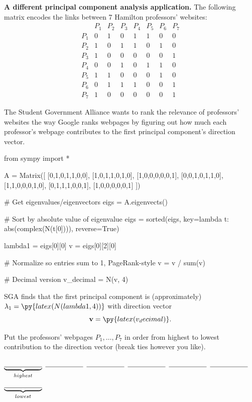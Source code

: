 \documentclass[12pt,addpoints]{exam}
\begin{document}
\begin{questions}
\question[5] \textbf{A different principal component analysis application.} The following matrix encodes the links between 7 Hamilton professors' websites:
\[
\begin{array}{c|ccccccc}
& P_1 & P_2 & P_3 & P_4 & P_5 & P_6 & P_7 \\
\hline
P_1 & 0 & 1 & 0 & 1 & 1 & 0 & 0 \\
P_2 & 1 & 0 & 1 & 1 & 0 & 1 & 0 \\
P_3 & 1 & 0 & 0 & 0 & 0 & 0 & 1 \\
P_4 & 0 & 0 & 1 & 0 & 1 & 1 & 0 \\
P_5 & 1 & 1 & 0 & 0 & 0 & 1 & 0 \\
P_6 & 0 & 1 & 1 & 1 & 0 & 0 & 1 \\
P_7 & 1 & 0 & 0 & 0 & 0 & 0 & 1
\end{array}
\]

The Student Government Alliance wants to rank the relevance of professors' websites the way Google ranks webpages by figuring out how much each professor's webpage contributes to the first principal component's direction vector.

\begin{pycode}
from sympy import *

A = Matrix([
[0,1,0,1,1,0,0],
[1,0,1,1,0,1,0],
[1,0,0,0,0,0,1],
[0,0,1,0,1,1,0],
[1,1,0,0,0,1,0],
[0,1,1,1,0,0,1],
[1,0,0,0,0,0,1]
])

# Get eigenvalues/eigenvectors
eigs = A.eigenvects()

# Sort by absolute value of eigenvalue
eigs = sorted(eigs, key=lambda t: abs(complex(N(t[0]))), reverse=True)

lambda1 = eigs[0][0]
v = eigs[0][2][0]

# Normalize so entries sum to 1, PageRank-style
v = v / sum(v)

# Decimal version
v_decimal = N(v, 4)
\end{pycode}

SGA finds that the first principal component is (approximately)
$\lambda_1 = \py{latex(N(lambda1,4))}$ with direction vector \[\mathbf v =
\py{latex(v_decimal)}.
\]

Put the professors' webpages $P_1, \ldots, P_7$ in order from highest to lowest contribution to the direction vector (break ties however you like).

\begin{center}
$\underbrace{\underline{\hspace{.75in}}}_{highest}$ \quad$\underline{\hspace{.75in}}$ \quad
$\underline{\hspace{.75in}}$ \quad
$\underline{\hspace{.75in}}$ \quad
$\underline{\hspace{.75in}}$ \quad
$\underline{\hspace{.75in}}$ \quad
$\underbrace{\underline{\hspace{.75in}}}_{lowest}$ \quad
\end{center}


\end{questions}
\end{document}
